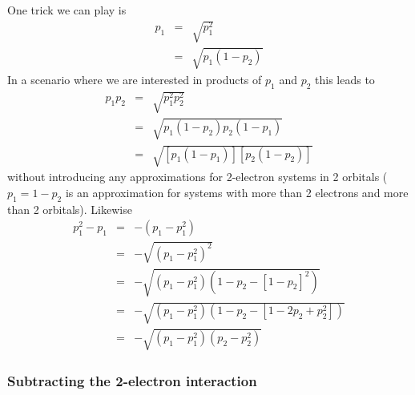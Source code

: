 \documentclass[pra]{revtex4-1}
\begin{document}
One trick we can play is
\begin{eqnarray}
 p_1 &=& \sqrt{p_1^2} \\
     &=& \sqrt{p_1(1-p_2)} 
\end{eqnarray}
In a scenario where we are interested in products of $p_1$ and $p_2$ this leads to
\begin{eqnarray}
  p_1p_2 &=& \sqrt{p_1^2p_2^2} \\
         &=& \sqrt{p_1(1-p_2)p_2(1-p_1)} \\
         &=& \sqrt{[p_1(1-p_1)][p_2(1-p_2)]}
\end{eqnarray}
without introducing any approximations for 2-electron systems in 2 orbitals ($p_1=1-p_2$
is an approximation for systems with more than 2 electrons and more than 2 orbitals). 
Likewise
\begin{eqnarray}
  p_1^2-p_1 &=& -(p_1-p_1^2) \\
            &=& -\sqrt{(p_1-p_1^2)^2} \\
            &=& -\sqrt{(p_1-p_1^2)(1-p_2-[1-p_2]^2)} \\
            &=& -\sqrt{(p_1-p_1^2)(1-p_2-[1-2p_2+p_2^2])} \\
            &=& -\sqrt{(p_1-p_1^2)(p_2-p_2^2)} 
\end{eqnarray}

\subsubsection{Subtracting the 2-electron interaction}
\end{document}
